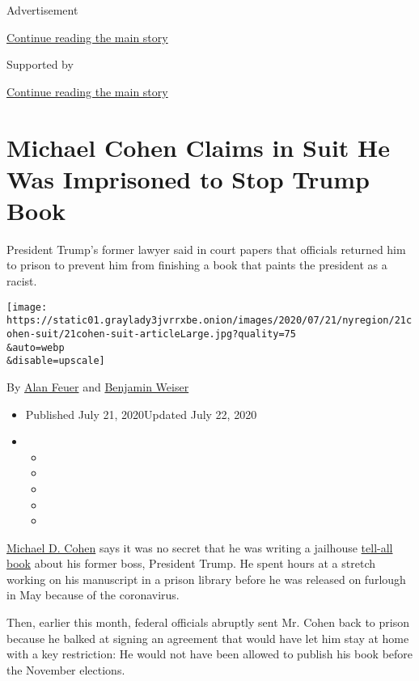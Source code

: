 Advertisement

\protect\hyperlink{after-top}{Continue reading the main story}

Supported by

\protect\hyperlink{after-sponsor}{Continue reading the main story}

\hypertarget{michael-cohen-claims-in-suit-he-was-imprisoned-to-stop-trump-book}{%
\section{Michael Cohen Claims in Suit He Was Imprisoned to Stop Trump
Book}\label{michael-cohen-claims-in-suit-he-was-imprisoned-to-stop-trump-book}}

President Trump's former lawyer said in court papers that officials
returned him to prison to prevent him from finishing a book that paints
the president as a racist.

\texttt{[image: https://static01.graylady3jvrrxbe.onion/images/2020/07/21/nyregion/21cohen-suit/21cohen-suit-articleLarge.jpg?quality=75\\\&auto=webp\\\&disable=upscale]}

By \href{https://www.nytimes3xbfgragh.onion/by/alan-feuer}{Alan Feuer}
and
\href{https://www.nytimes3xbfgragh.onion/by/benjamin-weiser}{Benjamin
Weiser}

\begin{itemize}
\item
  Published July 21, 2020Updated July 22, 2020
\item
  \begin{itemize}
  \item
  \item
  \item
  \item
  \item
  \end{itemize}
\end{itemize}

\href{https://www.nytimes3xbfgragh.onion/2020/07/23/nyregion/michael-cohen-trump-book.html}{Michael
D. Cohen} says it was no secret that he was writing a jailhouse
\href{https://www.nytimes3xbfgragh.onion/2020/07/22/nyregion/michael-cohen-donald-trump-prison.html}{tell-all
book} about his former boss, President Trump. He spent hours at a
stretch working on his manuscript in a prison library before he was
released on furlough in May because of the coronavirus.

Then, earlier this month, federal officials abruptly sent Mr. Cohen back
to prison because he balked at signing an agreement that would have let
him stay at home with a key restriction: He would not have been allowed
to publish his book before the November elections.

